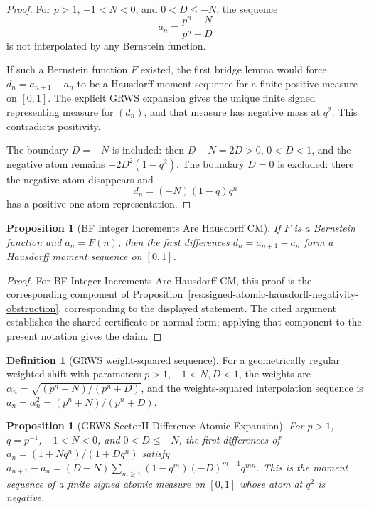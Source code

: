 \documentclass[11pt]{article}
\numberwithin{equation}{section}
\newtheorem{proposition}[theorem]{Proposition}
\theoremstyle{definition}
\newtheorem{definition}{Definition}[section]
\theoremstyle{remark}
\newcommand{\1}{\mathbf 1}
\begin{document}
\begin{proof}
For \(p>1\), \(-1<N<0\), and \(0<D\le -N\), the sequence
\[
a_n=\frac{p^n+N}{p^n+D}
\]
is not interpolated by any Bernstein function.

If such a Bernstein function \(F\) existed, the first bridge lemma would force \(d_n=a_{n+1}-a_n\) to be a Hausdorff moment sequence for a finite positive measure on \([0,1]\). The explicit GRWS expansion gives the unique finite signed representing measure for \((d_n)\), and that measure has negative mass at \(q^2\). This contradicts positivity.

The boundary \(D=-N\) is included: then \(D-N=2D>0\), \(0<D<1\), and the negative atom remains \(-2D^2(1-q^2)\). The boundary \(D=0\) is excluded: there the negative atom disappears and
\[
d_n=(-N)(1-q)q^n
\]
has a positive one-atom representation.
\end{proof}

\begin{proposition}[BF Integer Increments Are Hausdorff CM]
\label{res:bf-integer-increments-are-hausdorff-cm}
If \(F\) is a Bernstein function and \(a_n=F(n)\), then the first differences \(d_n=a_{n+1}-a_n\) form a Hausdorff moment sequence on \([0,1]\).
\end{proposition}

\begin{proof}
For BF Integer Increments Are Hausdorff CM, this proof is the corresponding component of Proposition~\ref{res:signed-atomic-hausdorff-negativity-obstruction}.  corresponding to the displayed statement.  The cited argument establishes the shared certificate or normal form; applying that component to the present notation gives the claim.
\end{proof}

\begin{definition}[GRWS weight-squared sequence]
\label{res:grws-weightsquared-sequence}
For a geometrically regular weighted shift with parameters \(p>1\), \(-1<N,D<1\), the weights are \(\alpha_n=\sqrt{(p^n+N)/(p^n+D)}\), and the weights-squared interpolation sequence is \(a_n=\alpha_n^2=(p^n+N)/(p^n+D)\).
\end{definition}

\begin{proposition}[GRWS SectorII Difference Atomic Expansion]
\label{res:grws-sectorii-difference-atomic-expansion}
For \(p>1\), \(q=p^{-1}\), \(-1<N<0\), and \(0<D\le -N\), the first differences of \(a_n=(1+Nq^n)/(1+Dq^n)\) satisfy \(a_{n+1}-a_n=(D-N)\sum_{m\ge1}(1-q^m)(-D)^{m-1}q^{mn}\). This is the moment sequence of a finite signed atomic measure on \([0,1]\) whose atom at \(q^2\) is negative.
\end{proposition}
\end{document}

